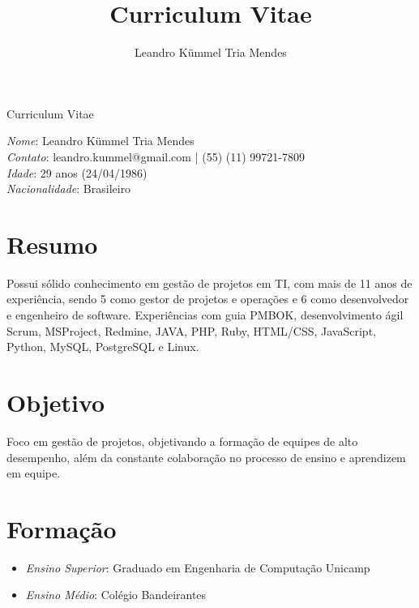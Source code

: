 \documentclass[a4paper,10pt]{article}
\title{Curriculum Vitae}
\author{Leandro Kümmel Tria Mendes}
\begin{document}
\begin{center} 
Curriculum Vitae
\end{center} 
\emph{Nome}: Leandro Kümmel Tria Mendes\\
\emph{Contato}: leandro.kummel@gmail.com | (55) (11) 99721-7809\\
\emph{Idade}: 29 anos (24/04/1986)\\
\emph{Nacionalidade}: Brasileiro\\
\section{Resumo}

  Possui sólido conhecimento em gestão de projetos em TI, com mais de 11 anos de experiência, sendo 5 como gestor de projetos e operações e 6 como desenvolvedor e engenheiro de software. Experiências com guia PMBOK, desenvolvimento ágil Scrum, MSProject, Redmine, JAVA, PHP, Ruby, HTML/CSS, JavaScript, Python, MySQL, PostgreSQL e Linux.
\section{Objetivo}

  Foco em gestão de projetos, objetivando a formação de equipes de alto desempenho, além da constante colaboração no processo de ensino e aprendizem em equipe. 
\section{Formação}
\begin{itemize}
\item \emph{Ensino Superior}: Graduado em Engenharia de Computação Unicamp 
\item \emph{Ensino Médio}: Colégio Bandeirantes

\end{itemize}
\end{document}
